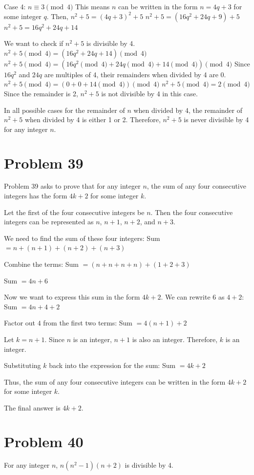 \documentclass{article}
\begin{document}
Case 4: $n \equiv 3 \pmod{4}$
This means $n$ can be written in the form $n = 4q + 3$ for some integer $q$.
Then, $n^2 + 5 = (4q + 3)^2 + 5$
$n^2 + 5 = (16q^2 + 24q + 9) + 5$
$n^2 + 5 = 16q^2 + 24q + 14$

We want to check if $n^2 + 5$ is divisible by 4.
$n^2 + 5 \pmod{4} = (16q^2 + 24q + 14) \pmod{4}$
$n^2 + 5 \pmod{4} = (16q^2 \pmod{4} + 24q \pmod{4} + 14 \pmod{4}) \pmod{4}$
Since $16q^2$ and $24q$ are multiples of 4, their remainders when divided by 4 are 0.
$n^2 + 5 \pmod{4} = (0 + 0 + 14 \pmod{4}) \pmod{4}$
$n^2 + 5 \pmod{4} = 2 \pmod{4}$
Since the remainder is 2, $n^2 + 5$ is not divisible by 4 in this case.

In all possible cases for the remainder of $n$ when divided by 4, the remainder of $n^2 + 5$ when divided by 4 is either 1 or 2. Therefore, $n^2 + 5$ is never divisible by 4 for any integer $n$.

\newpage

\section*{Problem 39}
Problem 39 asks to prove that for any integer $n$, the sum of any four consecutive integers has the form $4k + 2$ for some integer $k$.

Let the first of the four consecutive integers be $n$.
Then the four consecutive integers can be represented as $n$, $n+1$, $n+2$, and $n+3$.

We need to find the sum of these four integers:
Sum $= n + (n+1) + (n+2) + (n+3)$

Combine the terms:
Sum $= (n+n+n+n) + (1+2+3)$

Sum $= 4n + 6$

Now we want to express this sum in the form $4k + 2$.
We can rewrite $6$ as $4 + 2$:
Sum $= 4n + 4 + 2$

Factor out $4$ from the first two terms:
Sum $= 4(n+1) + 2$

Let $k = n+1$.
Since $n$ is an integer, $n+1$ is also an integer.
Therefore, $k$ is an integer.

Substituting $k$ back into the expression for the sum:
Sum $= 4k + 2$

Thus, the sum of any four consecutive integers can be written in the form $4k + 2$ for some integer $k$.

The final answer is $\boxed{4k+2}$.

\newpage

\section*{Problem 40}
For any integer $n$, $n(n^2 - 1)(n + 2)$ is divisible by 4.
\end{document}
